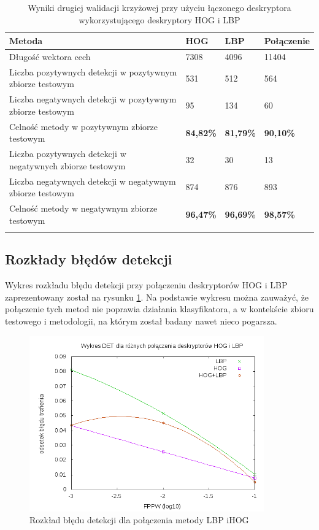 \begin{center}
    \begin{longtable}{ | p{5cm} | p{3cm} | p{3cm} | p{3cm} |}
    \hline
	Metoda & HOG & LBP & Połączenie \\ \hline
    Długość wektora cech & 7308 & 4096 & 11404 \\ \hline
    Liczba pozytywnych detekcji w pozytywnym zbiorze testowym & 531 & 512 & 564 \\ \hline
    Liczba negatywnych detekcji w pozytywnym zbiorze testowym & 95 & 134 & 60 \\ \hline
    Celność metody w pozytywnym zbiorze testowym & \textbf{84,82\%} & \textbf{81,79\%} & \textbf{90,10\%} \\ \hline
    Liczba pozytywnych detekcji w negatywnych zbiorze testowym & 32 & 30 & 13 \\ \hline
    Liczba negatywnych detekcji w negatywnym zbiorze testowym & 874 & 876 & 893 \\ \hline
    Celność metody w negatywnym zbiorze testowym & \textbf{96,47\%} & \textbf{96,69\%} & \textbf{98,57\%} \\ \hline
    \caption{Wyniki drugiej walidacji krzyżowej przy użyciu łączonego deskryptora wykorzystującego deskryptory HOG i LBP} \\
    \end{longtable}
\end{center}


\subsection{Rozkłady błędów detekcji}

Wykres rozkładu błędu detekcji przy połączeniu deskryptorów HOG i LBP zaprezentowany został na rysunku \ref{fig:hoglbp_det}. Na podstawie wykresu można zauważyć, że połączenie tych metod nie poprawia działania klasyfikatora, a w kontekście zbioru testowego i metodologii, na którym został badany nawet nieco pogarsza.

\begin{figure}[htb]
\centering
\includegraphics[width=0.9\textwidth]{hoglbp_det.png}
\caption{Rozkład błędu detekcji dla połączenia metody LBP iHOG}
\label{fig:hoglbp_det}
\end{figure}


